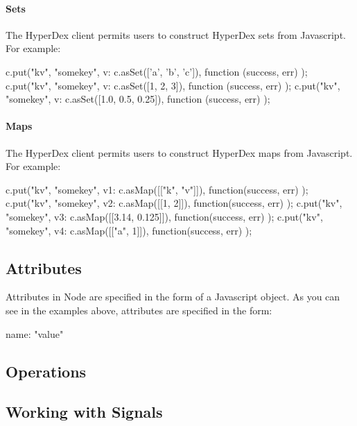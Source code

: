 \paragraph{Sets}

The HyperDex client permits users to construct HyperDex sets from Javascript.
For example:

\begin{javascriptcode}
c.put("kv", "somekey", {v: c.asSet(['a', 'b', 'c'])}, function (success, err) {});
c.put("kv", "somekey", {v: c.asSet([1, 2, 3])}, function (success, err) {});
c.put("kv", "somekey", {v: c.asSet([1.0, 0.5, 0.25])}, function (success, err) {});
\end{javascriptcode}

\paragraph{Maps}

The HyperDex client permits users to construct HyperDex maps from Javascript.
For example:

\begin{javascriptcode}
c.put("kv", "somekey", {v1: c.asMap([["k", "v"]])}, function(success, err) {});
c.put("kv", "somekey", {v2: c.asMap([[1, 2]])}, function(success, err) {});
c.put("kv", "somekey", {v3: c.asMap([[3.14, 0.125]])}, function(success, err) {});
c.put("kv", "somekey", {v4: c.asMap([["a", 1]])}, function(success, err) {});
\end{javascriptcode}

\subsection{Attributes}
\label{sec:api:node:attributes}

Attributes in Node are specified in the form of a Javascript object.  As you can
see in the examples above, attributes are specified in the form:

\begin{javascriptcode}
{name: "value"}
\end{javascriptcode}

\subsection{Operations}
\label{sec:api:node:ops}


\pagebreak

\subsection{Working with Signals}
\label{sec:api:node:signals}

